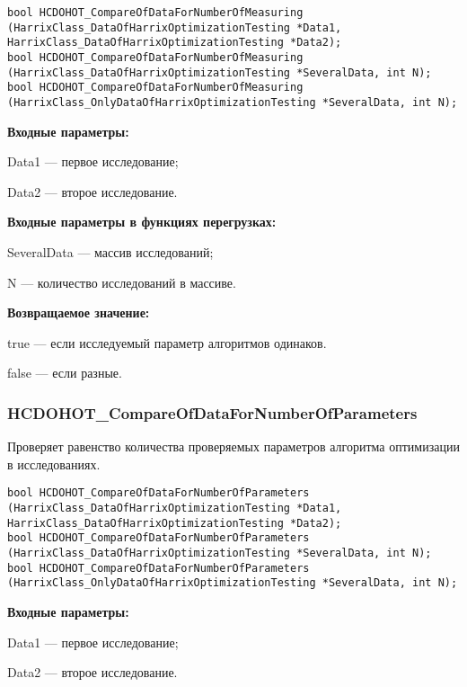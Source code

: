\documentclass[a4paper,12pt]{article}
\begin{document}
\begin{lstlisting}[label=code_syntax_HCDOHOT_CompareOfDataForNumberOfMeasuring,caption=Синтаксис]
bool HCDOHOT_CompareOfDataForNumberOfMeasuring (HarrixClass_DataOfHarrixOptimizationTesting *Data1, HarrixClass_DataOfHarrixOptimizationTesting *Data2);
bool HCDOHOT_CompareOfDataForNumberOfMeasuring (HarrixClass_DataOfHarrixOptimizationTesting *SeveralData, int N);
bool HCDOHOT_CompareOfDataForNumberOfMeasuring (HarrixClass_OnlyDataOfHarrixOptimizationTesting *SeveralData, int N);
\end{lstlisting}

\textbf{Входные параметры:}

Data1 --- первое исследование;

Data2 --- второе исследование.

\textbf{Входные параметры в функциях перегрузках:}

SeveralData --- массив исследований;

N --- количество исследований в массиве.

\textbf{Возвращаемое значение:}

true --- если исследуемый параметр алгоритмов одинаков.

false --- если разные.


\subsubsection{HCDOHOT\_CompareOfDataForNumberOfParameters}\label{HCDOHOT_CompareOfDataForNumberOfParameters}

Проверяет равенство количества проверяемых параметров алгоритма оптимизации в исследованиях.


\begin{lstlisting}[label=code_syntax_HCDOHOT_CompareOfDataForNumberOfParameters,caption=Синтаксис]
bool HCDOHOT_CompareOfDataForNumberOfParameters (HarrixClass_DataOfHarrixOptimizationTesting *Data1, HarrixClass_DataOfHarrixOptimizationTesting *Data2);
bool HCDOHOT_CompareOfDataForNumberOfParameters (HarrixClass_DataOfHarrixOptimizationTesting *SeveralData, int N);
bool HCDOHOT_CompareOfDataForNumberOfParameters (HarrixClass_OnlyDataOfHarrixOptimizationTesting *SeveralData, int N);
\end{lstlisting}

\textbf{Входные параметры:}

Data1 --- первое исследование;

Data2 --- второе исследование.
\end{document}
